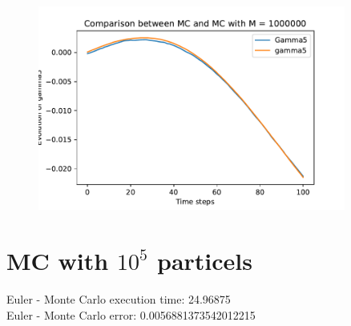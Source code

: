 \documentclass[a4paper,11pt,openright]{report}
\begin{document}
\begin{figure}[H]
\centering
\includegraphics[width=0.9\textwidth]{gamma5 MC = 1000000.pdf}
\end{figure}
\newpage

\section{MC with $10^5$ particels}
Euler - Monte Carlo execution time:  24.96875 \\
Euler - Monte Carlo error:  0.0056881373542012215
\end{document}
